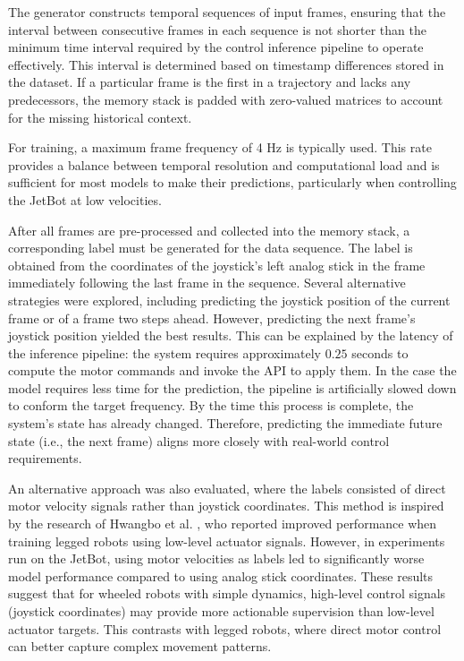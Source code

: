 The generator constructs temporal sequences of input frames, ensuring that the interval between consecutive frames in each sequence is not shorter than the minimum time interval required by the control inference pipeline to operate effectively. This interval is determined based on timestamp differences stored in the dataset. If a particular frame is the first in a trajectory and lacks any predecessors, the memory stack is padded with zero-valued matrices to account for the missing historical context.

For training, a maximum frame frequency of 4 Hz is typically used. This rate provides a balance between temporal resolution and computational load and is sufficient for most models to make their predictions, particularly when controlling the JetBot at low velocities.

After all frames are pre-processed and collected into the memory stack, a corresponding label must be generated for the data sequence. The label is obtained from the coordinates of the joystick's left analog stick in the frame immediately following the last frame in the sequence. Several alternative strategies were explored, including predicting the joystick position of the current frame or of a frame two steps ahead. However, predicting the next frame's joystick position yielded the best results. This can be explained by the latency of the inference pipeline: the system requires approximately $0.25$ seconds to compute the motor commands and invoke the API to apply them. In the case the model requires less time for the prediction, the pipeline is artificially slowed down to conform the target frequency. By the time this process is complete, the system's state has already changed. Therefore, predicting the immediate future state (i.e., the next frame) aligns more closely with real-world control requirements.

An alternative approach was also evaluated, where the labels consisted of direct motor velocity signals rather than joystick coordinates. This method is inspired by the research of Hwangbo et al. \autocite{hwangbo2019learning}, who reported improved performance when training legged robots using low-level actuator signals. However, in experiments run on the JetBot, using motor velocities as labels led to significantly worse model performance compared to using analog stick coordinates. These results suggest that for wheeled robots with simple dynamics, high-level control signals (joystick coordinates) may provide more actionable supervision than low-level actuator targets. This contrasts with legged robots, where direct motor control can better capture complex movement patterns.

